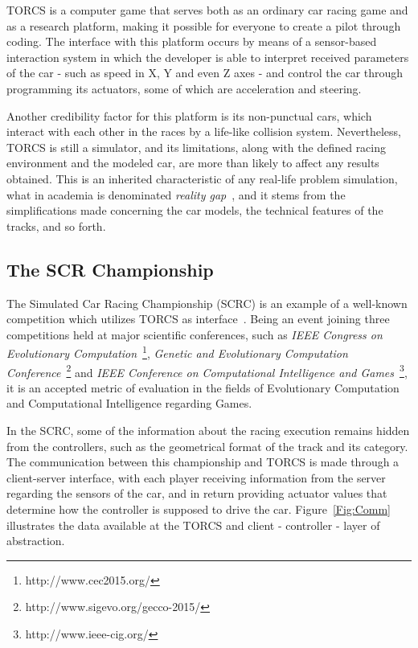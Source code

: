 	TORCS is a computer game that serves both as an ordinary car racing game and as a research platform, making it possible for everyone to create a pilot through coding. The interface with this platform occurs by means of a sensor-based interaction system in which the developer is able to interpret received parameters of the car - such as speed in X, Y and even Z axes - and control the car through programming its actuators, some of which are acceleration and steering.
	
	Another credibility factor for this platform is its non-punctual cars, which interact with each other in the races by a life-like collision system. Nevertheless, TORCS is still a simulator, and its limitations, along with the defined racing environment and the modeled car, are more than likely to affect any results obtained. This is an inherited characteristic of any real-life problem simulation, what in academia is denominated \emph{reality gap}~\cite{RG}, and it stems from the simplifications made concerning the car models, the technical features of the tracks, and so forth.

\subsection{The SCR Championship} \label{subsec:SCRC}

	The Simulated Car Racing Championship (SCRC) is an example of a well-known competition which utilizes TORCS as interface~\cite{SCR}. Being an event joining three competitions held at major scientific conferences, such as \emph{IEEE Congress on Evolutionary Computation}~\footnote{http://www.cec2015.org/}, \emph{Genetic and Evolutionary Computation Conference}~\footnote{http://www.sigevo.org/gecco-2015/} and \emph{IEEE Conference on Computational Intelligence and Games}~\footnote{http://www.ieee-cig.org/}, it is an accepted metric of evaluation in the fields of Evolutionary Computation and Computational Intelligence regarding Games.
	
	In the SCRC, some of the information about the racing execution remains hidden from the controllers, such as the geometrical format of the track and its category. The communication between this championship and TORCS is made through a client-server interface, with each player receiving information from the server regarding the sensors of the car, and in return providing actuator values that determine how the controller is supposed to drive the car. Figure~\ref{Fig:Comm} illustrates the data available at the TORCS and client - controller - layer of abstraction.

